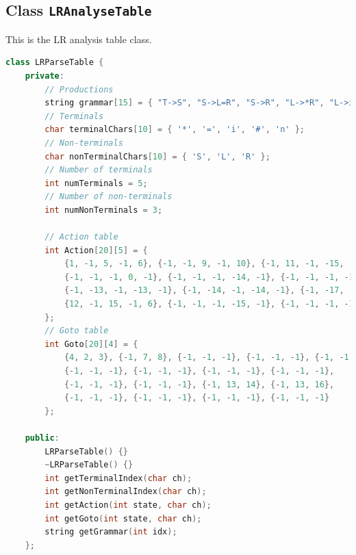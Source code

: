 \documentclass[a4paper,12pt]{article}
\begin{document}
\subsection{Class \texttt{LRAnalyseTable}}
This is the LR analysis table class.
\begin{lstlisting}[language=c++]
class LRParseTable {
    private:
        // Productions
        string grammar[15] = { "T->S", "S->L=R", "S->R", "L->*R", "L->i", "R->L", "R->i", "R->n" };
        // Terminals
        char terminalChars[10] = { '*', '=', 'i', '#', 'n' };
        // Non-terminals
        char nonTerminalChars[10] = { 'S', 'L', 'R' };
        // Number of terminals
        int numTerminals = 5;
        // Number of non-terminals
        int numNonTerminals = 3;
    
        // Action table
        int Action[20][5] = {
            {1, -1, 5, -1, 6}, {-1, -1, 9, -1, 10}, {-1, 11, -1, -15, -1}, {-1, -1, -1, -12, -1},
            {-1, -1, -1, 0, -1}, {-1, -1, -1, -14, -1}, {-1, -1, -1, -17, -1}, {-1, -15, -1, -15, -1},
            {-1, -13, -1, -13, -1}, {-1, -14, -1, -14, -1}, {-1, -17, -1, -17, -1}, {12, -1, 15, -1, 6},
            {12, -1, 15, -1, 6}, {-1, -1, -1, -15, -1}, {-1, -1, -1, -11, -1}, {-1, -1, -1, -16, -1}, {-1, -1, -1, -13, -1}
        };
        // Goto table
        int Goto[20][4] = {
            {4, 2, 3}, {-1, 7, 8}, {-1, -1, -1}, {-1, -1, -1}, {-1, -1, -1},
            {-1, -1, -1}, {-1, -1, -1}, {-1, -1, -1}, {-1, -1, -1},
            {-1, -1, -1}, {-1, -1, -1}, {-1, 13, 14}, {-1, 13, 16},
            {-1, -1, -1}, {-1, -1, -1}, {-1, -1, -1}, {-1, -1, -1}
        };
    
    public:
        LRParseTable() {}
        ~LRParseTable() {}
        int getTerminalIndex(char ch);
        int getNonTerminalIndex(char ch);
        int getAction(int state, char ch);
        int getGoto(int state, char ch);
        string getGrammar(int idx);
    };
\end{lstlisting}
\end{document}
